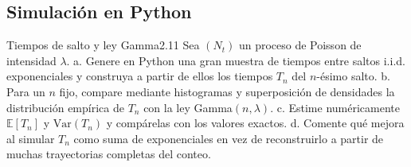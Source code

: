 \documentclass[10pt,a4paper]{article}
\begin{document}
\newpage
\subsection{Simulación en Python}

\begin{ejercicio}{Tiempos de salto y ley Gamma}{2.11}
    Sea $(N_t)$ un proceso de Poisson de intensidad $\lambda$.
    a. Genere en Python una gran muestra de tiempos entre saltos i.i.d. exponenciales y construya a partir de ellos los tiempos $T_n$ del $n$-ésimo salto.
    b. Para un $n$ fijo, compare mediante histogramas y superposición de densidades la distribución empírica de $T_n$ con la ley Gamma$(n, \lambda)$.
    c. Estime numéricamente $\mathbb{E}[T_n]$ y $\text{Var}(T_n)$ y compárelas con los valores exactos.
    d. Comente qué mejora al simular $T_n$ como suma de exponenciales en vez de reconstruirlo a partir de muchas trayectorias completas del conteo.
\end{ejercicio}
\end{document}
